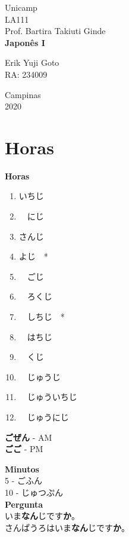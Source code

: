 \documentclass[a4paper, 12pt]{article}
\begin{document}
\begin{titlepage} %
	\begin{center} %
		{\large Unicamp}\\[0.2cm] %
		{\large LA111}\\[0.2cm] %
		{\large Prof. Bartira Takiuti Ginde}\\[3.2cm]
		{\bf \huge Japonês I}\\[5.1cm] %
	\end{center} %
	{\large Erik Yuji Goto}\\[0.5cm] %
	{\large RA: 234009}\\[10cm]
	\begin{center}
		{\large Campinas}\\[0.2cm]
		{\large 2020}
	\end{center}
\end{titlepage} %

\tableofcontents

\newpage
\section{Horas}
	\Large
	\textbf{Horas}
	\normalsize
	\begin{CJK}{UTF8}{min}
		\begin{enumerate}
			\item いちじ
			\item　にじ
			\item さんじ
			\item よじ　*
			\item　ごじ
			\item　ろくじ
			\item　しちじ　*
			\item　はちじ
　			\item　くじ
			\item　じゅうじ
			\item　じゅういちじ
			\item　じゅうにじ
		\end{enumerate}
	\textbf{ごぜん} - AM\\
	\textbf{ごご} - PM
	
	\Large
	\textbf{Minutos}\\
	\normalsize
	5 - ごふん\\
	10 - じゅつぷん　　\\
	
	\Large
	\textbf{Pergunta}\\
	\normalsize
	いま\textbf{なん}じです\textbf{か}。\\
	さんぱうろはいま\textbf{なん}じです\textbf{か}。
	\end{CJK}
\end{document}
